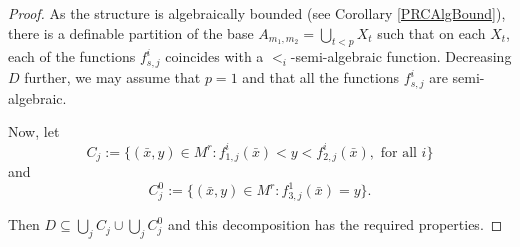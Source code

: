 \documentclass[12pt]{article}
\newtheorem{thm}{Theorem}[section]
\newtheorem{lemme}[thm]{Lemma}
\theoremstyle{definition}
\theoremstyle{mystyle}
\theoremstyle{remark}
\newcommand{\Li}{\mathcal{L}^{(i)}_{\text{ring}}}
\begin{document}
\begin{proof}
As the structure is algebraically bounded (see Corollary \ref{PRCAlgBound}), there is a definable partition of the base $A_{m_1,m_2} = \bigcup_{t<p} X_t$ such that on each $X_t$, each of the functions $f^ i_{s,j}$ coincides with a $<_i$-semi-algebraic function. Decreasing $D$ further, we may assume that $p=1$ and that all the functions $f^ i_{s,j}$ are semi-algebraic.

Now, let
\[C_{j}:=\{ (\bar{x}, y) \in M^r:  f^i_{1,j}(\bar{x}) < y < f_{2,j}^i(\bar{x}), \text{ for all }i \}\] and
\[C_{j}^0:=\{ (\bar{x}, y) \in M^r: f^1_{3,j}(\bar{x}) = y \}.\]


Then $D\subseteq \bigcup_j C_{j} \cup \bigcup_j C_{j}^0$ and this decomposition has the required properties.
\end{proof}
%
%


%
\end{document}
